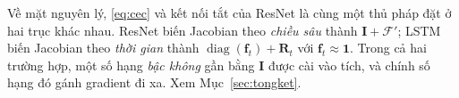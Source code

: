 Về mặt nguyên lý, \eqref{eq:cec} và kết nối tắt của ResNet là cùng một thủ pháp
đặt ở hai trục khác nhau. ResNet biến Jacobian theo \emph{chiều sâu} thành
$\mathbf{I}+\mathcal{F}'$; LSTM biến Jacobian theo \emph{thời gian} thành
$\operatorname{diag}(\mathbf{f}_t)+\mathbf{R}_t$ với $\mathbf{f}_t\approx\mathbf{1}$.
Trong cả hai trường hợp, một số hạng \emph{bậc không} gần bằng $\mathbf{I}$ được
cài vào tích, và chính số hạng đó gánh gradient đi xa. Xem
Mục~\ref{sec:tongket}.
